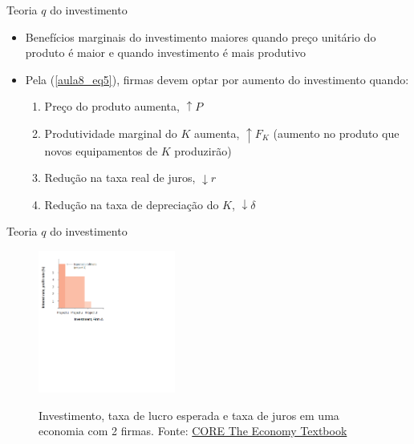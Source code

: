 \documentclass[10pt]{beamer}
\begin{document}
\begin{frame}
    {Teoria $q$ do investimento}
    \begin{itemize}
        \item Benefícios marginais do investimento maiores quando preço unitário do produto é maior e quando investimento é mais produtivo\bigskip
        \item Pela (\ref{aula8_eq5}), firmas devem optar por aumento do investimento quando:
        \begin{enumerate}
            \item Preço do produto aumenta, $\uparrow P$\medskip
            \item Produtividade marginal do $K$ aumenta, $\uparrow F_K$ (aumento no produto que novos equipamentos de $K$ produzirão)\medskip
            \item Redução na taxa real de juros, $\downarrow r$\medskip
            \item Redução na taxa de depreciação do $K$, $\downarrow \delta$
        \end{enumerate}
    \end{itemize}
\end{frame}

\begin{frame}
    {Teoria $q$ do investimento}
    \begin{figure}
        \centering
        \href{https://core-econ.org/the-economy/book/text/14.html\#144-investment-spending}{\includegraphics[width=0.4\textwidth]{./figures/aula8_fig2.PNG}}
        \caption{Investimento, taxa de lucro esperada e taxa de juros em uma economia com 2 firmas. Fonte: \href{https://core-econ.org/the-economy/book/text/14.html\#144-investment-spending}{CORE The Economy Textbook}}
    \end{figure}
\end{frame}
\end{document}
